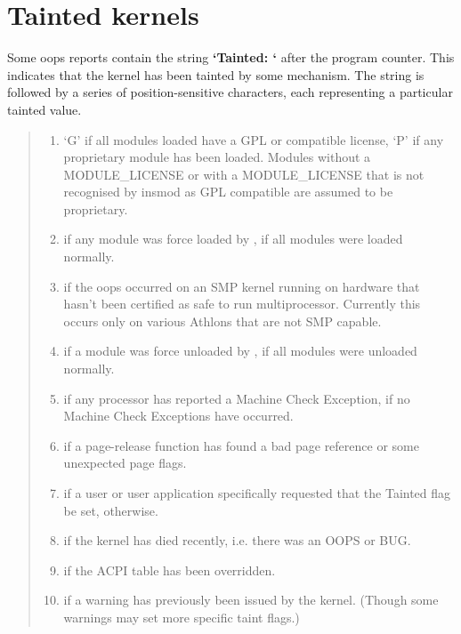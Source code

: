 \documentclass[a4paper,8pt,english]{sphinxmanual}
\begin{document}
\chapter{Tainted kernels}
\label{admin-guide/tainted-kernels::doc}\label{admin-guide/tainted-kernels:tainted-kernels}
Some oops reports contain the string \textbf{`Tainted: `} after the program
counter. This indicates that the kernel has been tainted by some
mechanism.  The string is followed by a series of position-sensitive
characters, each representing a particular tainted value.
\begin{quote}
\begin{enumerate}
\item {} 
`G' if all modules loaded have a GPL or compatible license, `P' if
any proprietary module has been loaded.  Modules without a
MODULE\_LICENSE or with a MODULE\_LICENSE that is not recognised by
insmod as GPL compatible are assumed to be proprietary.

\item {} 
 if any module was force loaded by ,  if all
modules were loaded normally.

\item {} 
 if the oops occurred on an SMP kernel running on hardware that
hasn't been certified as safe to run multiprocessor.
Currently this occurs only on various Athlons that are not
SMP capable.

\item {} 
 if a module was force unloaded by ,  if all
modules were unloaded normally.

\item {} 
 if any processor has reported a Machine Check Exception,
 if no Machine Check Exceptions have occurred.

\item {} 
 if a page-release function has found a bad page reference or
some unexpected page flags.

\item {} 
 if a user or user application specifically requested that the
Tainted flag be set,  otherwise.

\item {} 
 if the kernel has died recently, i.e. there was an OOPS or BUG.

\item {} 
 if the ACPI table has been overridden.

\end{enumerate}
\begin{enumerate}
\setcounter{enumi}{9}
\item {} 
 if a warning has previously been issued by the kernel.
(Though some warnings may set more specific taint flags.)


\end{enumerate}
\end{quote}
\end{document}
